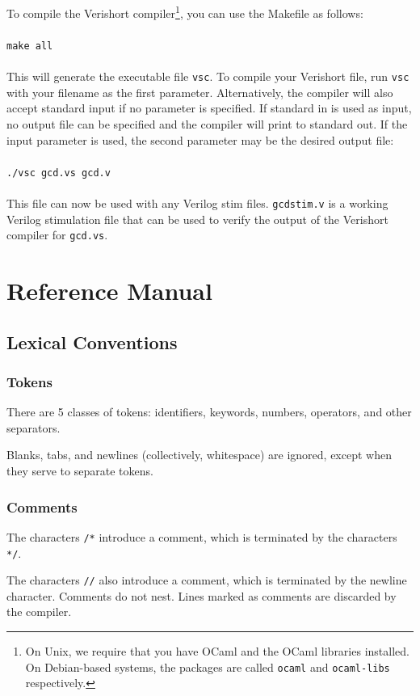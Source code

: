 \documentclass[letterpaper,11pt]{article}
\begin{document}
To compile the Verishort compiler\footnote{On Unix, we require that you have OCaml and the OCaml libraries installed.  On Debian-based systems, the packages are called \texttt{ocaml} and \texttt{ocaml-libs} respectively.}, you can use the Makefile as follows:\\\\
\texttt{make all}\\\\
This will generate the executable file \texttt{vsc}.  To compile your Verishort file, run \texttt{vsc} with your filename as the first parameter.  Alternatively, the compiler will also accept standard input if no parameter is specified.  If standard in is used as input, no output file can be specified and the compiler will print to standard out.  If the input parameter is used, the second parameter may be the desired output file:\\\\
\texttt{./vsc gcd.vs gcd.v}\\\\
This file can now be used with any Verilog stim files.  \texttt{gcdstim.v} is a working Verilog stimulation file that can be used to verify the output of the Verishort compiler for \texttt{gcd.vs}.

\section{Reference Manual}
    \subsection{Lexical Conventions}
        \subsubsection{Tokens}
        There are 5 classes of tokens: identifiers, keywords, numbers, operators, and other separators.
        
        Blanks, tabs, and newlines (collectively, whitespace) are ignored, except when they serve
        to separate tokens.
        
        \subsubsection{Comments}
        The characters \texttt{/*} introduce a comment, which is terminated by the characters \texttt{*/}.
        
        The characters \texttt{//} also introduce a comment, which is terminated by the newline character. Comments do not 
        nest. Lines marked as comments are discarded by the compiler.
        
\end{document}
